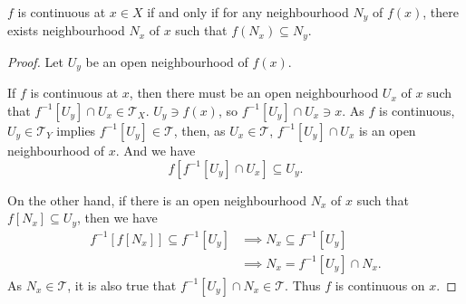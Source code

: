 \begin{proposition}
	$f$ is continuous at $x \in X$ if and only if for any neighbourhood $N_{y}$ of $f(x)$, there exists neighbourhood $N_x$ of $x$ such that $f(N_x) \subseteq N_y$.
	
	\begin{proof}
		Let $U_y$ be an open neighbourhood of $f(x)$.
		
		If $f$ is continuous at $x$, then there must be an open neighbourhood $U_x$ of $x$ such that $f^{-1}[U_y] \cap U_x \in \mathcal T_X$. $U_y \ni f(x)$, so $f^{-1}[U_y] \cap U_x \ni x$. As $f$ is continuous, $U_y \in \mathcal T_Y$ implies $f^{-1}[U_y] \in \mathcal T$, then, as $U_x \in \mathcal T$, $f^{-1}[U_y] \cap U_x$ is an open neighbourhood of $x$. And we have
		$$
		f[f^{-1}[U_y] \cap U_x] \subseteq U_y.
		$$
		
		On the other hand, if there is an open neighbourhood $N_x$ of $x$ such that $f[N_x] \subseteq U_y$, then we have
		$$
		\begin{aligned}
			f^{-1}[f[N_x]] \subseteq f^{-1}[U_y] &\implies N_x \subseteq f^{-1}[U_y] \\
			&\implies N_x = f^{-1}[U_y] \cap N_x.
		\end{aligned}
		$$
		As $N_x \in \mathcal T$, it is also true that $f^{-1}[U_y] \cap N_x \in \mathcal T$. Thus $f$ is continuous on $x$.
	\end{proof}
\end{proposition}







































%